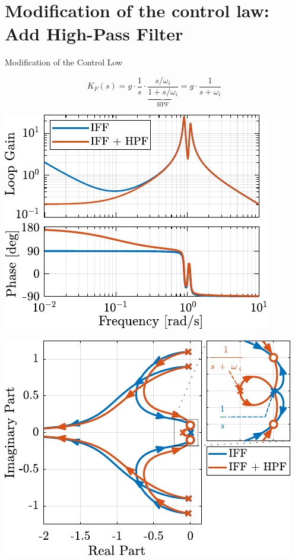 \documentclass[t, minted]{clean-beamer}
\begin{document}
\section{Modification of the control law: Add High-Pass Filter}
\label{sec:orgc733c30}
\begin{frame}[label={sec:orga459f5e}]{Modification of the Control Low}
\vspace{-1em}

\begin{equation*}
  K_{F}(s) = g \cdot \frac{1}{s} \cdot \underbrace{\frac{s/\omega_i}{1 + s/\omega_i}}_{\text{HPF}} = g \cdot \frac{1}{s + \omega_i}
\end{equation*}

\begin{minipage}[b]{0.45\linewidth}
\begin{center}
\includegraphics[width=\linewidth]{figs/loop_gain_modified_iff.pdf}
\end{center}
\end{minipage}
\hfill
\begin{minipage}[b]{0.5\linewidth}
\begin{center}
\includegraphics[width=\linewidth]{figs/root_locus_modified_iff.pdf}

\end{center}
\end{minipage}
\end{frame}
\end{document}

